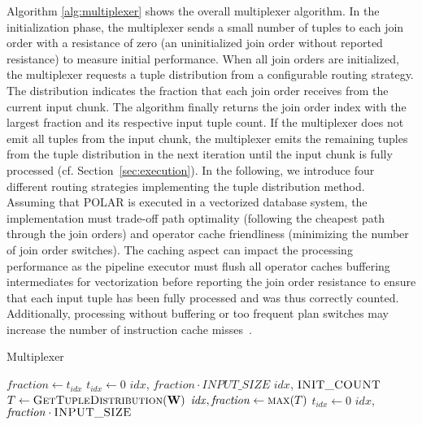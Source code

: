 Algorithm \ref{alg:multiplexer} shows the overall multiplexer algorithm. In the initialization phase, the multiplexer sends a small number of tuples to each join order with a resistance of zero (\ie an uninitialized join order without reported resistance) to measure initial performance. When all join orders are initialized, the multiplexer requests a tuple distribution from a configurable routing strategy. The distribution indicates the fraction that each join order receives from the current input chunk. The algorithm finally returns the join order index with the largest fraction and its respective input tuple count. If the multiplexer does not emit all tuples from the input chunk, the multiplexer emits the remaining tuples from the tuple distribution in the next iteration until the input chunk is fully processed (cf. Section~\ref{sec:execution}).
%
In the following, we introduce four different routing strategies implementing the tuple distribution method. Assuming that POLAR is executed in a vectorized database system, the implementation must trade-off path optimality (following the cheapest path through the join orders) and operator cache friendliness (minimizing the number of join order switches). The caching aspect can impact the processing performance as the pipeline executor must flush all operator caches buffering intermediates for vectorization before reporting the join order resistance to ensure that each input tuple has been fully processed and was thus correctly counted. Additionally, processing without buffering or too frequent plan switches may increase the number of instruction cache misses~\cite{SirinTPA16}. 

\begin{algorithm}[!t]
\caption{Multiplexer}\label{alg:multiplexer} \small
\begin{algorithmic}[1]
    \State $\mathit{fraction} \gets t_{\mathit{idx}}$ 
    \State $t_{\mathit{idx}} \gets 0$
    \State\Return $\mathit{idx}$, $\mathit{fraction} \cdot \mathit{INPUT\_SIZE}$
 
    \State\Return $\mathit{idx}$, $\textsc{INIT\_COUNT}$
\EndIf
\State $T \gets \textsc{GetTupleDistribution}(\mathbf{W})$
\State $\mathit{idx}, \mathit{fraction} \gets \textsc{max}(T)$
\State $t_{\mathit{idx}} \gets 0$
\State\Return $\mathit{idx}$, $\mathit{fraction} \cdot \textsc{INPUT\_SIZE}$
\end{algorithmic}
\end{algorithm}

